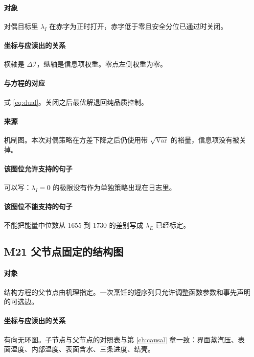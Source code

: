 \paragraph{对象}
对偶目标里 $\lambda_I$ 在赤字为正时打开，赤字低于零且安全分位已通过时关闭。

\paragraph{坐标与应读出的关系}
横轴是 $\Delta\mathcal{I}$，纵轴是信息项权重。零点左侧权重为零。

\paragraph{与方程的对应}
式 \eqref{eq:dual}。关闭之后最优解退回纯品质控制。

\paragraph{来源}
机制图。本次对偶策略在方差下降之后仍使用带 $\sqrt{\mathrm{Var}}$ 的裕量，信息项没有被关掉。

\paragraph{该图位允许支持的句子}
可以写：$\lambda_I=0$ 的极限没有作为单独策略出现在日志里。

\paragraph{该图位不能支持的句子}
不能把能量中位数从 1655 到 1730 的差别写成 $\lambda_E$ 已经标定。

\subsection{M21 父节点固定的结构图}
\paragraph{对象}
结构方程的父节点由机理指定。一次烹饪的短序列只允许调整函数参数和事先声明的可选边。

\paragraph{坐标与应读出的关系}
有向无环图。子节点与父节点的对照表与第 \ref{ch:causal} 章一致：界面蒸汽压、表面温度、内部温度、表面含水、三条进度、结壳。

